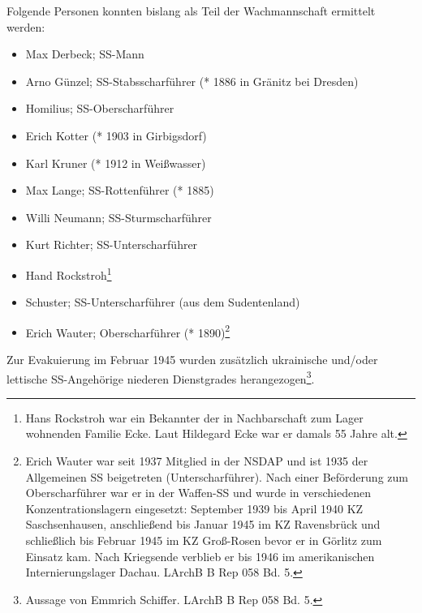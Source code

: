 \documentclass[a4paper,12pt,ngerman,
]{nisebook}
\begin{document}
Folgende Personen konnten bislang als Teil der Wachmannschaft ermittelt werden:
\begin{itemize}
\item Max Derbeck; SS-Mann

\item Arno Günzel; SS-Stabsscharführer (* 1886 in Gränitz bei Dresden)

\item Homilius; SS-Oberscharführer

\item Erich Kotter (* 1903 in Girbigsdorf)


\item Karl Kruner (* 1912 in Weißwasser)

\item Max Lange; SS-Rottenführer (* 1885)

\item Willi Neumann; SS-Sturmscharführer

\item Kurt Richter; SS-Unterscharführer

\item Hand Rockstroh\footnote{Hans Rockstroh war ein Bekannter der in Nachbarschaft zum Lager wohnenden Familie Ecke. Laut Hildegard Ecke war er damals 55 Jahre alt.}

\item Schuster; SS-Unterscharführer (aus dem Sudentenland)

\item Erich Wauter; Oberscharführer (* 1890)\footnote{Erich Wauter war seit 1937 Mitglied in der NSDAP und ist 1935 der Allgemeinen SS beigetreten (Unterscharführer). Nach einer Beförderung zum Oberscharführer war er in der Waffen-SS und wurde in verschiedenen Konzentrationslagern eingesetzt: September 1939 bis April 1940 KZ Saschsenhausen, anschließend bis Januar 1945 im KZ Ravensbrück und schließlich bis Februar 1945 im KZ Groß-Rosen bevor er in Görlitz zum Einsatz kam. Nach Kriegsende verblieb er bis 1946 im amerikanischen Internierungslager Dachau. LArchB B Rep 058 Bd. 5.}

\end{itemize}

Zur Evakuierung im Februar 1945 wurden zusätzlich ukrainische und/oder lettische SS-Angehörige niederen Dienstgrades herangezogen\footnote{Aussage von Emmrich Schiffer. LArchB B Rep 058 Bd. 5.}.
\end{document}
